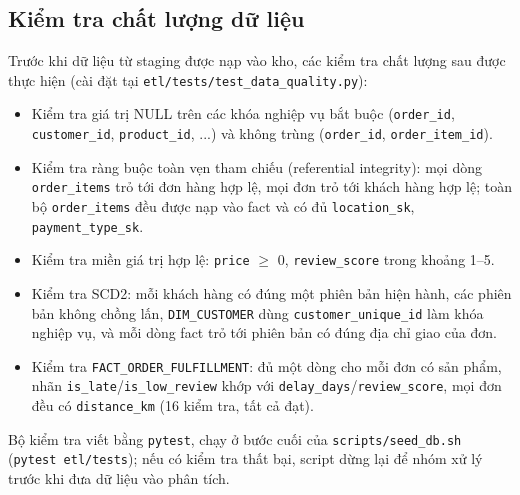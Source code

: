 \subsection{Kiểm tra chất lượng dữ liệu}
\hspace{1cm}
Trước khi dữ liệu từ staging được nạp vào kho, các kiểm tra chất lượng sau được thực hiện
(cài đặt tại \texttt{etl/tests/test\_data\_quality.py}):
\begin{itemize}
    \item Kiểm tra giá trị NULL trên các khóa nghiệp vụ bắt buộc (\texttt{order\_id},
          \texttt{customer\_id}, \texttt{product\_id}, ...) và không trùng
          (\texttt{order\_id}, \texttt{order\_item\_id}).
    \item Kiểm tra ràng buộc toàn vẹn tham chiếu (referential integrity): mọi dòng
          \texttt{order\_items} trỏ tới đơn hàng hợp lệ, mọi đơn trỏ tới khách hàng hợp lệ;
          toàn bộ \texttt{order\_items} đều được nạp vào fact và có đủ
          \texttt{location\_sk}, \texttt{payment\_type\_sk}.
    \item Kiểm tra miền giá trị hợp lệ: \texttt{price} $\geq$ 0, \texttt{review\_score}
          trong khoảng 1--5.
    \item Kiểm tra SCD2: mỗi khách hàng có đúng một phiên bản hiện hành, các phiên bản không
          chồng lấn, \texttt{DIM\_CUSTOMER} dùng \texttt{customer\_unique\_id} làm khóa
          nghiệp vụ, và mỗi dòng fact trỏ tới phiên bản có đúng địa chỉ giao của đơn.
    \item Kiểm tra \texttt{FACT\_ORDER\_FULFILLMENT}: đủ một dòng cho mỗi đơn có sản phẩm, nhãn
          \texttt{is\_late}/\texttt{is\_low\_review} khớp với \texttt{delay\_days}/\texttt{review\_score},
          mọi đơn đều có \texttt{distance\_km} (16 kiểm tra, tất cả đạt).
\end{itemize}
Bộ kiểm tra viết bằng \texttt{pytest}, chạy ở bước cuối của \texttt{scripts/seed\_db.sh}
(\texttt{pytest etl/tests}); nếu có kiểm tra thất bại, script dừng lại để nhóm xử lý trước
khi đưa dữ liệu vào phân tích.
